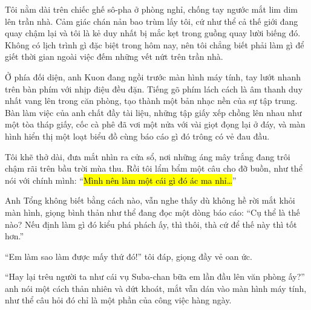 \documentclass[../main.tex]{subfiles}
\begin{document}


Tôi nằm dài trên chiếc ghế sô-pha ở phòng nghỉ, chống tay ngước mắt lim dim lên trần nhà. Cảm giác chán nản bao trùm lấy tôi, cứ như thể cả thế giới đang quay chậm lại và tôi là kẻ duy nhất bị mắc kẹt trong guồng quay lười biếng đó. Không có lịch trình gì đặc biệt trong hôm nay, nên tôi chẳng biết phải làm gì để giết thời gian ngoài việc đếm những vết nứt trên trần nhà.


Ở phía đối diện, anh Kuon đang ngồi trước màn hình máy tính, tay lướt nhanh trên bàn phím với nhịp điệu đều đặn. Tiếng gõ phím lách cách là âm thanh duy nhất vang lên trong căn phòng, tạo thành một bản nhạc nền của sự tập trung. Bàn làm việc của anh chất đầy tài liệu, những tập giấy xếp chồng lên nhau như một tòa tháp giấy, cốc cà phê đã vơi một nửa với vài giọt đọng lại ở đáy, và màn hình hiển thị một loạt biểu đồ cùng báo cáo gì đó trông có vẻ đau đầu.

Tôi khẽ thở dài, đưa mắt nhìn ra cửa sổ, nơi những áng mây trắng đang trôi chậm rãi trên bầu trời mùa thu. Rồi tôi lẩm bẩm một câu cho đỡ buồn, như thể nói với chính mình: ``\hl{Mình nên làm một cái gì đó ác ma nhỉ\dots}''

Anh Tổng không biết bằng cách nào, vẫn nghe thấy dù không hề rời mắt khỏi màn hình, giọng bình thản như thể đang đọc một dòng báo cáo: ``Cụ thể là thế nào? Nếu định làm gì đó kiểu phá phách ấy, thì thôi, thà cứ để thế này thì tốt hơn.''

``Em làm sao làm được mấy thứ đó!'' tôi đáp, giọng đầy vẻ oan ức.

``Hay lại trêu người ta như cái vụ Suba-chan bữa em lần đầu lên văn phòng ấy?'' anh nói một cách thản nhiên và dứt khoát, mắt vẫn dán vào màn hình máy tính, như thể câu hỏi đó chỉ là một phần của công việc hàng ngày.
\end{document}
